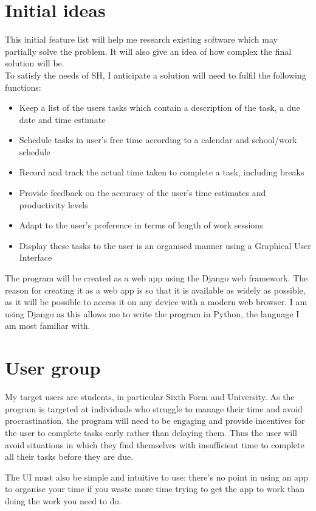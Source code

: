 \documentclass{article}
\begin{document}
\section{Initial ideas}
This initial feature list will help me research existing software which may
partially solve the problem. It will also give an idea of how complex the final
solution will be.\\

To satisfy the needs of SH, I anticipate a solution will need to fulfil the
following functions:

\begin{itemize}
\item Keep a list of the users tasks which contain a description of the task, a
  due date and time estimate
\item Schedule tasks in user's free time according to a calendar and school/work
  schedule
\item Record and track the actual time taken to complete a task, including
  breaks
\item Provide feedback on the accuracy of the user's time estimates and
  productivity levels
\item Adapt to the user's preference in terms of length of work sessions
\item Display these tasks to the user is an organised manner using a Graphical
  User Interface
\end{itemize}

The program will be created as a web app using the Django web framework. The
reason for creating it as a web app is so that it is available as widely as
possible, as it will be possible to access it on any device with a modern web
browser. I am using Django as this allows me to write the program in Python, the
language I am most familiar with.

\section{User group}
My target users are students, in particular Sixth Form and University. As the
program is targeted at individuals who struggle to manage their time and avoid
procrastination, the program will need to be engaging and provide incentives for
the user to complete tasks early rather than delaying them. Thus the user will
avoid situations in which they find themselves with insufficient time to
complete all their tasks before they are due.

The UI must also be simple and intuitive to use: there's no point in using an
app to organise your time if you waste more time trying to get the app to work
than doing the work you need to do.
\end{document}
